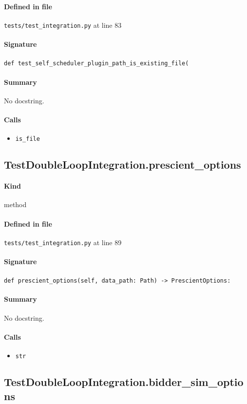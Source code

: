 \documentclass[11pt]{report}
\begin{document}
\paragraph{Defined in file} \texttt{tests/test\_integration.py} at line 83
\paragraph{Signature} \texttt{def test\_self\_scheduler\_plugin\_path\_is\_existing\_file(}
\paragraph{Summary} No docstring.
\paragraph{Calls}
\begin{itemize}[leftmargin=*]
  \item \texttt{is\_file}
\end{itemize}
\subsection{TestDoubleLoopIntegration.prescient\_options}
\label{def:tests-test_integration.py:TestDoubleLoopIntegration.prescient_options:L89}
\paragraph{Kind} method
\paragraph{Defined in file} \texttt{tests/test\_integration.py} at line 89
\paragraph{Signature} \texttt{def prescient\_options(self, data\_path: Path) -> PrescientOptions:}
\paragraph{Summary} No docstring.
\paragraph{Calls}
\begin{itemize}[leftmargin=*]
  \item \texttt{str}
\end{itemize}
\subsection{TestDoubleLoopIntegration.bidder\_sim\_options}
\label{def:tests-test_integration.py:TestDoubleLoopIntegration.bidder_sim_options:L119}
\end{document}
